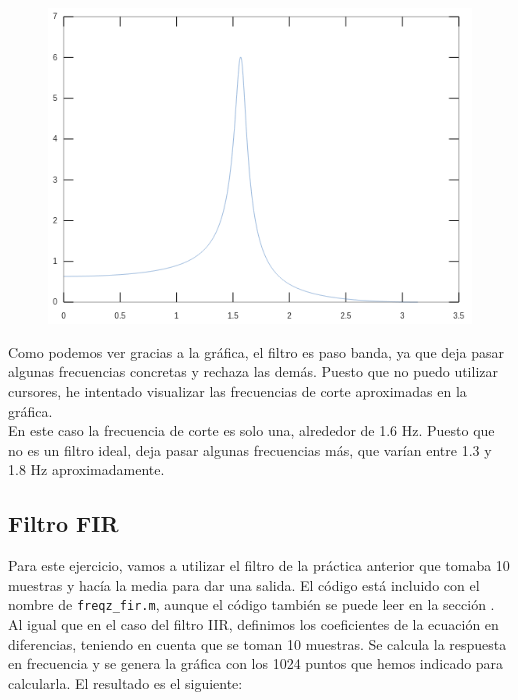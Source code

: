 \documentclass[11pt,a4paper]{article}
\begin{document}
\begin{figure}[H]
	\centering
	\includegraphics[scale=0.4]{img/freqz-iir.png}
\end{figure}

Como podemos ver gracias a la gráfica, el filtro es paso banda, ya que deja pasar algunas frecuencias concretas y rechaza las demás. Puesto que no puedo utilizar cursores, he intentado visualizar las frecuencias de corte aproximadas en la gráfica.\\

En este caso la frecuencia de corte es solo una, alrededor de 1.6 Hz. Puesto que no es un filtro ideal, deja pasar algunas frecuencias más, que varían entre 1.3 y 1.8 Hz aproximadamente.

\subsection{Filtro FIR}

Para este ejercicio, vamos a utilizar el filtro de la práctica anterior que tomaba 10 muestras y hacía la media para dar una salida. El código está incluido con el nombre de \texttt{freqz\_fir.m}, aunque el código también se puede leer en la sección \color{deepred}\color{black}.\\

Al igual que en el caso del filtro IIR, definimos los coeficientes de la ecuación en diferencias, teniendo en cuenta que se toman 10 muestras. Se calcula la respuesta en frecuencia y se genera la gráfica con los 1024 puntos que hemos indicado para calcularla. El resultado es el siguiente:
\end{document}
